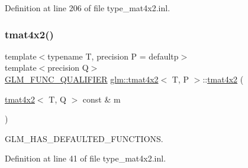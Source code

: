 Definition at line 206 of file type\+\_\+mat4x2.\+inl.

\mbox{\label{structglm_1_1tmat4x2_aabba725bdf197091f8eab5a583201fca}} 
\subsubsection{\texorpdfstring{tmat4x2()}{tmat4x2()}\hspace{0.1cm}{\footnotesize\ttfamily [19/22]}}
{\footnotesize\ttfamily template$<$typename T, precision P = defaultp$>$ \\
template$<$precision Q$>$ \\
\mbox{\hyperlink{setup_8hpp_a33fdea6f91c5f834105f7415e2a64407}{G\+L\+M\+\_\+\+F\+U\+N\+C\+\_\+\+Q\+U\+A\+L\+I\+F\+I\+ER}} \mbox{\hyperlink{structglm_1_1tmat4x2}{glm\+::tmat4x2}}$<$ T, P $>$\+::\mbox{\hyperlink{structglm_1_1tmat4x2}{tmat4x2}} (\begin{DoxyParamCaption}\item[{\mbox{\hyperlink{structglm_1_1tmat4x2}{tmat4x2}}$<$ T, Q $>$ const \&}]{m }\end{DoxyParamCaption})}



G\+L\+M\+\_\+\+H\+A\+S\+\_\+\+D\+E\+F\+A\+U\+L\+T\+E\+D\+\_\+\+F\+U\+N\+C\+T\+I\+O\+NS. 



Definition at line 41 of file type\+\_\+mat4x2.\+inl.

\mbox{\label{structglm_1_1tmat4x2_af1595b0913a2bc31ff60ab847a351d4e}} 
